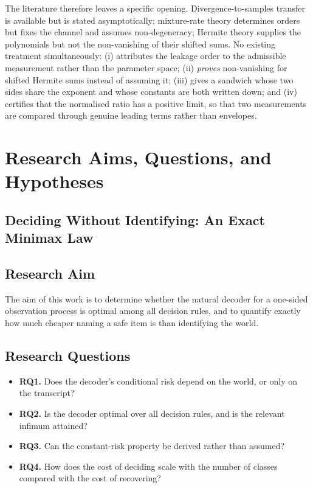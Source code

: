 The literature therefore leaves a specific opening. Divergence-to-samples transfer is
available but is stated asymptotically; mixture-rate theory determines orders but fixes the
channel and assumes non-degeneracy; Hermite theory supplies the polynomials but not the
non-vanishing of their shifted sums. No existing treatment simultaneously: (i) attributes
the leakage order to the admissible measurement rather than the parameter space;
(ii) \emph{proves} non-vanishing for shifted Hermite sums instead of assuming it;
(iii) gives a sandwich whose two sides share the exponent and whose constants are both
written down; and (iv) certifies that the normalised ratio has a positive limit, so that two
measurements are compared through genuine leading terms rather than envelopes.


\section{Research Aims, Questions, and Hypotheses}

\subsection{Deciding Without Identifying: An Exact Minimax Law}

\subsection{Research Aim}

The aim of this work is to determine whether the natural decoder for a one-sided observation
process is optimal among all decision rules, and to quantify exactly how much cheaper naming
a safe item is than identifying the world.

\subsection{Research Questions}

\begin{itemize}
\item \textbf{RQ1.} Does the decoder's conditional risk depend on the world, or only on the
transcript?
\item \textbf{RQ2.} Is the decoder optimal over all decision rules, and is the relevant
infimum attained?
\item \textbf{RQ3.} Can the constant-risk property be derived rather than assumed?
\item \textbf{RQ4.} How does the cost of deciding scale with the number of classes compared
with the cost of recovering?
\end{itemize}

